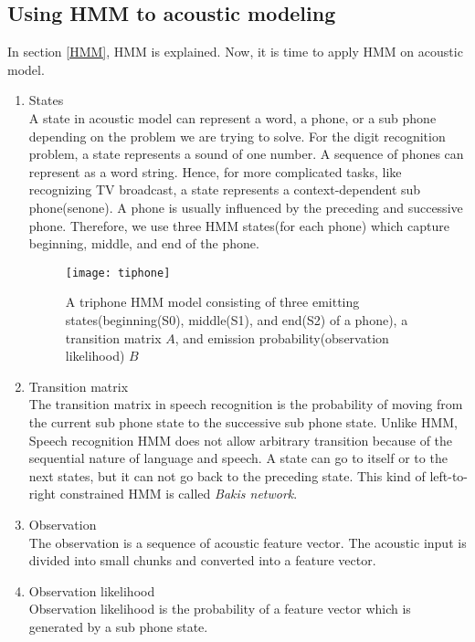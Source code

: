 \subsection{Using HMM to acoustic modeling}
In section \ref{HMM}, HMM is explained. Now, it is time to apply HMM on acoustic model. 
\begin{enumerate}
\item States \\
A state in acoustic model can represent a word, a phone, or a sub phone depending on the problem we are trying to solve. For the digit recognition problem, a state represents a sound of one number. A sequence of phones can represent as a word string. Hence, for more complicated tasks, like recognizing TV broadcast, a state represents a context-dependent sub phone(senone). A phone is usually influenced by the preceding and successive phone. Therefore, we use three HMM states(for each phone) which capture beginning, middle, and  end of the phone. 

\begin{figure}[H]
\caption{A triphone HMM model consisting of three emitting states(beginning(S0), middle(S1), and end(S2) of a phone), a transition matrix $A$, and emission probability(observation likelihood) $B$ \cite{SiliconAM}}
\texttt{[image: tiphone]}
\centering
\end{figure}

\item Transition matrix \\
The transition matrix in speech recognition is the probability of moving from the current sub phone state to the successive sub phone state. Unlike HMM, Speech recognition HMM does not allow arbitrary transition because of the sequential nature of language and speech. A state can go to itself or to the next states, but it can not go back to the preceding state. This kind of left-to-right constrained HMM is called \textit{Bakis network}.

\item Observation \\
The observation is a sequence of acoustic feature vector. The acoustic input is divided into small chunks and converted into a feature vector.

\item Observation likelihood \\
Observation likelihood is the probability of a feature vector which is generated by a sub phone state. 

\end{enumerate}


